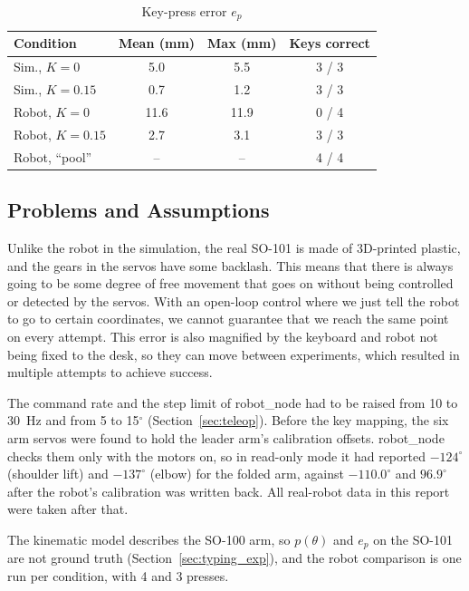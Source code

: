 \documentclass[letterpaper, 10 pt, conference]{ieeeconf}
\begin{document}
\begin{table}[t]
\caption{Key-press error $e_p$}
\label{tab:typing}
\begin{center}
\footnotesize
\begin{tabular}{lccc}
\toprule
Condition & Mean (mm) & Max (mm) & Keys correct \\
\midrule
Sim., $K = 0$       & 5.0  & 5.5  & 3 / 3 \\
Sim., $K = 0.15$    & 0.7  & 1.2  & 3 / 3 \\
Robot, $K = 0$      & 11.6 & 11.9 & 0 / 4 \\
Robot, $K = 0.15$   & 2.7  & 3.1  & 3 / 3 \\
Robot, ``pool'' & -- & -- & 4 / 4 \\
\bottomrule
\end{tabular}
\end{center}
\end{table}

\balance
\subsection{Problems and Assumptions}
Unlike the robot in the simulation, the real SO-101 is made of 3D-printed plastic, and the gears in the servos
have some backlash. This means that there is always going to be some degree of free movement that goes on without
being controlled or detected by the servos. With an open-loop control where we just tell the robot to go to certain
coordinates, we cannot guarantee that we reach the same point on every attempt. This error is also magnified by the
keyboard and robot not being fixed to the desk, so they can move between experiments, which resulted in multiple
attempts to achieve success.

The command rate and the step limit of robot\_node had to be raised from 10 to 30~Hz and from 5 to
15$^\circ$ (Section~\ref{sec:teleop}). Before the key
mapping, the six arm servos were found to hold the leader arm's calibration offsets. robot\_node checks them
only with the motors on, so in read-only mode it had reported $-124^\circ$ (shoulder lift) and $-137^\circ$
(elbow) for the folded arm, against $-110.0^\circ$ and $96.9^\circ$ after the robot's calibration was written
back. All real-robot data in this report were taken after that.

The kinematic model describes the SO-100 arm, so $p(\theta)$ and $e_p$ on the SO-101 are not ground truth
(Section~\ref{sec:typing_exp}), and the robot comparison is one run per condition, with 4 and 3 presses.
\end{document}
